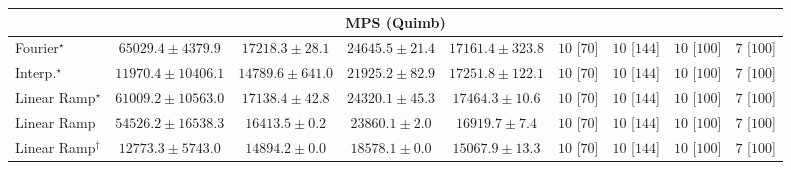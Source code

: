 \begin{tabular}{l|cccc|cccc|}
\cline{1-9}
\multicolumn{9}{c}{\rule{0pt}{8pt}MPS (Quimb)} \\
\midrule
Fourier$^\star$ & {\cellcolor[HTML]{B34003}} \color[HTML]{F1F1F1} $65029.4\pm 4379.9$ & {\cellcolor[HTML]{FEE28E}} \color[HTML]{000000} $17218.3\pm 28.1$ & {\cellcolor[HTML]{FECC61}} \color[HTML]{000000} $24645.5\pm 21.4$ & {\cellcolor[HTML]{FEE28E}} \color[HTML]{000000} $17161.4\pm 323.8$ & {\cellcolor[HTML]{49006A}} \color[HTML]{F1F1F1} $10$ [$70$] & {\cellcolor[HTML]{49006A}} \color[HTML]{F1F1F1} $10$ [$144$] & {\cellcolor[HTML]{49006A}} \color[HTML]{F1F1F1} $10$ [$100$] & {\cellcolor[HTML]{FFF7F3}} \color[HTML]{000000} $7$ [$100$] \\
Interp.$^\star$ & {\cellcolor[HTML]{FEECA4}} \color[HTML]{000000} $11970.4\pm 10406.1$ & {\cellcolor[HTML]{FEE799}} \color[HTML]{000000} $14789.6\pm 641.0$ & {\cellcolor[HTML]{FED471}} \color[HTML]{000000} $21925.2\pm 82.9$ & {\cellcolor[HTML]{FEE28E}} \color[HTML]{000000} $17251.8\pm 122.1$ & {\cellcolor[HTML]{49006A}} \color[HTML]{F1F1F1} $10$ [$70$] & {\cellcolor[HTML]{49006A}} \color[HTML]{F1F1F1} $10$ [$144$] & {\cellcolor[HTML]{49006A}} \color[HTML]{F1F1F1} $10$ [$100$] & {\cellcolor[HTML]{FFF7F3}} \color[HTML]{000000} $7$ [$100$] \\
Linear Ramp$^\star$ & {\cellcolor[HTML]{C64902}} \color[HTML]{F1F1F1} $61009.2\pm 10563.0$ & {\cellcolor[HTML]{FEE28E}} \color[HTML]{000000} $17138.4\pm 42.8$ & {\cellcolor[HTML]{FECD63}} \color[HTML]{000000} $24320.1\pm 45.3$ & {\cellcolor[HTML]{FEE18C}} \color[HTML]{000000} $17464.3\pm 10.6$ & {\cellcolor[HTML]{49006A}} \color[HTML]{F1F1F1} $10$ [$70$] & {\cellcolor[HTML]{49006A}} \color[HTML]{F1F1F1} $10$ [$144$] & {\cellcolor[HTML]{49006A}} \color[HTML]{F1F1F1} $10$ [$100$] & {\cellcolor[HTML]{FFF7F3}} \color[HTML]{000000} $7$ [$100$] \\
Linear Ramp & {\cellcolor[HTML]{DB5D0B}} \color[HTML]{F1F1F1} $54526.2\pm 16538.3$ & {\cellcolor[HTML]{FEE392}} \color[HTML]{000000} $16413.5\pm 0.2$ & {\cellcolor[HTML]{FECE65}} \color[HTML]{000000} $23860.1\pm 2.0$ & {\cellcolor[HTML]{FEE390}} \color[HTML]{000000} $16919.7\pm 7.4$ & {\cellcolor[HTML]{49006A}} \color[HTML]{F1F1F1} $10$ [$70$] & {\cellcolor[HTML]{49006A}} \color[HTML]{F1F1F1} $10$ [$144$] & {\cellcolor[HTML]{49006A}} \color[HTML]{F1F1F1} $10$ [$100$] & {\cellcolor[HTML]{FFF7F3}} \color[HTML]{000000} $7$ [$100$] \\
Linear Ramp$^\dagger$ & {\cellcolor[HTML]{FEEAA1}} \color[HTML]{000000} $12773.3\pm 5743.0$ & {\cellcolor[HTML]{FEE799}} \color[HTML]{000000} $14894.2\pm 0.0$ & {\cellcolor[HTML]{FEDE86}} \color[HTML]{000000} $18578.1\pm 0.0$ & {\cellcolor[HTML]{FEE697}} \color[HTML]{000000} $15067.9\pm 13.3$ & {\cellcolor[HTML]{49006A}} \color[HTML]{F1F1F1} $10$ [$70$] & {\cellcolor[HTML]{49006A}} \color[HTML]{F1F1F1} $10$ [$144$] & {\cellcolor[HTML]{49006A}} \color[HTML]{F1F1F1} $10$ [$100$] & {\cellcolor[HTML]{FFF7F3}} \color[HTML]{000000} $7$ [$100$] \\

\end{tabular}

